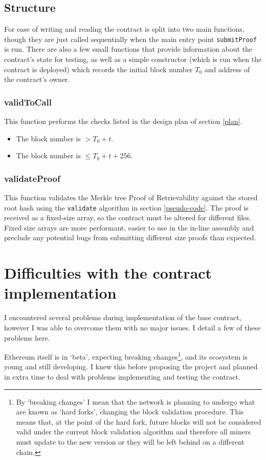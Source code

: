 \documentclass[12pt,a4paper,twoside,openright]{report}
\begin{document}
\subsection{Structure}

For ease of writing and reading the contract is split into two main functions, though they are just called sequentially when
the main entry point \texttt{submitProof} is run.
There are also a few small functions that provide information about the contract's state for testing, as well as a simple
constructor (which is run when the contract is deployed) which records the initial block number $T_0$ and address of the contract's owner.

\subsubsection{validToCall}

This function performs the checks listed in the design plan of section \ref{plan}.
\begin{itemize}
\item The block number is $> T_0 + t$.
\item The block number is $\leq T_0 + t + 256$.
\end{itemize}

\subsubsection{validateProof}

This function validates the Merkle tree Proof of Retrievability against the stored root hash using the \texttt{validate} algorithm in section \ref{pseudo-code}.
The proof is received as a fixed-size array, so the contract must be altered for different files.
Fixed size arrays are more performant, easier to use in the in-line assembly and preclude any potential bugs from submitting different size proofs than
expected.



\section{Difficulties with the contract implementation}

I encountered several problems during implementation of the base contract, however I was able to overcome them with no major issues.
I detail a few of these problems here.

Ethereum itself is in `beta', expecting breaking changes\footnote{
By `breaking changes' I mean that the network is planning to undergo what are known as `hard forks', changing the block validation procedure.
This means that, at the point of the hard fork, future blocks will not be considered valid under the current block validation algorithm and therefore all miners
must update to the new version or they will be left behind on a different chain.},
and its ecosystem is young and still developing.
I knew this before proposing the project and planned in extra time to deal with problems implementing and testing the contract.
\end{document}
